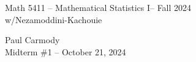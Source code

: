 \documentclass[10pt,a4paper]{report}
\newcommand{\CLASSNAME}{Math 5411 -- Mathematical Statistics I}
\newcommand{\PROFESSOR}{Nezamoddini-Kachouie}
\newcommand{\STUDENTNAME}{Paul Carmody}
\newcommand{\ASSIGNMENT}{Midterm \#1 }
\newcommand{\DUEDATE}{October 21, 2024}
\newcommand{\SEMESTER}{Fall 2024}
\begin{document}
\begin{center}
	\Large{\CLASSNAME -- \SEMESTER} \\
	\large{w/\PROFESSOR}
\end{center}
\begin{center}
	\STUDENTNAME \\
	\ASSIGNMENT -- \DUEDATE\\
\end{center}
\end{document}
